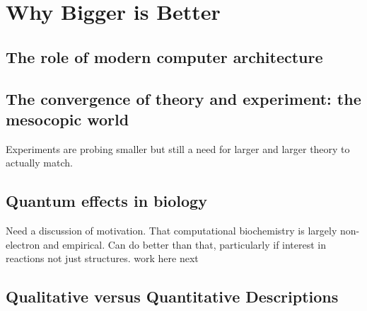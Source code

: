 \chapter{Why Bigger is Better}

\section{The role of modern computer architecture}

\section{The convergence of theory and experiment: the mesocopic world}
Experiments are probing smaller but still a need for larger and larger theory to actually match.

\section{Quantum effects in biology}
Need a discussion of motivation.  That computational biochemistry   is largely non-electron and empirical.  Can do better than that, particularly if interest in reactions not just structures.
 work here next


\section{Qualitative versus Quantitative Descriptions}
